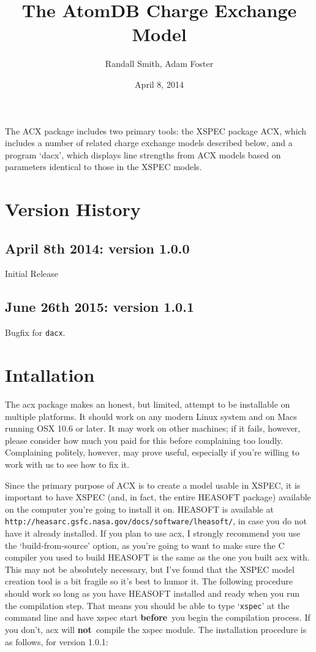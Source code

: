 \documentclass[11pt]{article}
\title{The AtomDB Charge Exchange Model}
\author{Randall Smith, Adam Foster}
\date{April 8, 2014}
\newcommand{\version}{1.0.1}
\begin{document}
\maketitle

The ACX package includes two primary tools: the XSPEC package ACX, which
includes a number of related charge exchange models described below,
and a program `dacx', which displays line strengths from ACX models
based on parameters identical to those in the XSPEC models.  

\section*{Version History}
\subsection*{April 8th 2014: version 1.0.0}
Initial Release
\subsection*{June 26th 2015: version 1.0.1}
Bugfix for \texttt{dacx}.


\section*{Intallation}

The acx package makes an honest, but limited, attempt to be installable
on multiple platforms.  It should work on any modern Linux system and
on Macs running OSX 10.6 or later.  It may work on other machines; if
it fails, however, please consider how much you paid for this before
complaining too loudly.  Complaining politely, however, may prove
useful, especially if you're willing to work with us to see how to fix
it.

Since the primary purpose of ACX is to create a model usable in XSPEC,
it is important to have XSPEC (and, in fact, the entire HEASOFT
package) available on the computer you're going to install it on.
HEASOFT is available at {\tt
http://heasarc.gsfc.nasa.gov/docs/software/lheasoft/}, in case you do
not have it already installed.  If you plan to use acx, I strongly
recommend you use the `build-from-source' option, as you're going to
want to make sure the C compiler you used to build HEASOFT is the same
as the one you built acx with.  This may not be absolutely necessary,
but I've found that the XSPEC model creation tool is a bit fragile so
it's best to humor it.  The following procedure should work so long as
you have HEASOFT installed and ready when you run the compilation
step.  That means you should be able to type `{\tt xspec}' at the
command line and have xspec start {\bf before}\ you begin the
compilation process.  If you don't, acx will {\bf not}\ compile the
xspec module.  The installation procedure is as follows, for version
\version:
\end{document}
